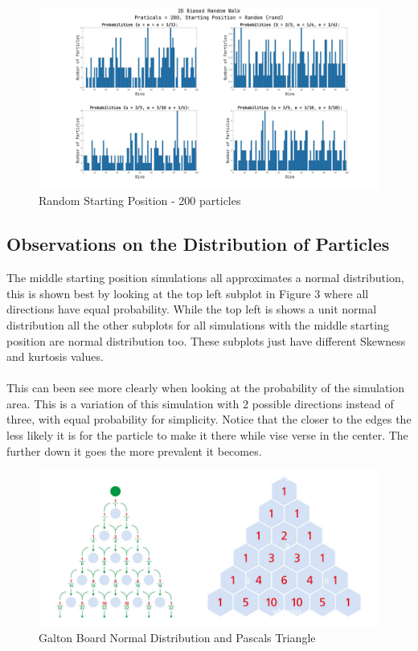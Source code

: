 \documentclass[a4paper]{article}
\begin{document}
\begin{figure}[h!]
  \includegraphics[width=\textwidth]{part1/p1_figure4}
  \caption{Random Starting Position - 200 particles}
  \label{fig:rsp200}
\end{figure}

\newpage

\subsection{Observations on the Distribution of Particles}
The middle starting position simulations all approximates a normal distribution, this is shown best by looking at the top left subplot in Figure 3 where all directions have equal probability. While the top left is shows a unit normal distribution all the other subplots for all simulations with the middle starting position are normal distribution too. These subplots just have different Skewness and kurtosis values.
\\
\\
This can been see more clearly when looking at the probability of the simulation area. This is a variation of this simulation with 2 possible directions instead of three, with equal probability for simplicity. Notice that the closer to the edges the less likely it is for the particle to make it there while vise verse in the center. The further down it goes the more prevalent it becomes.

\begin{figure}[h!]
  \includegraphics[width=\textwidth]{part1/galton-board-normal-distribution-and-pascals-triangle-a-triangular}
  \caption{Galton Board Normal Distribution and Pascals Triangle}
  \label{fig:rsp200}
\end{figure}
\end{document}
